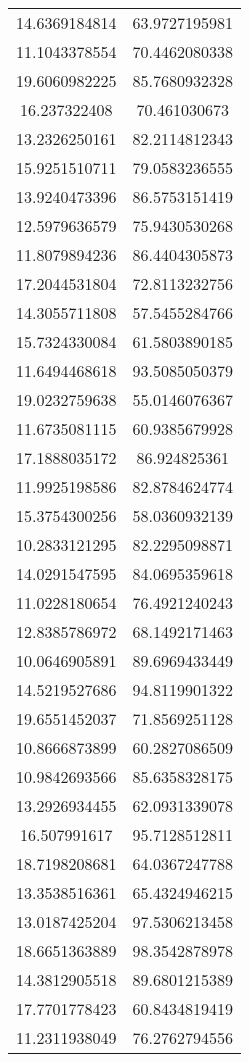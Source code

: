 \begin{table}
\begin{tabular}{cc}
14.6369184814 & 63.9727195981 \\
11.1043378554 & 70.4462080338 \\
19.6060982225 & 85.7680932328 \\
16.237322408 & 70.461030673 \\
13.2326250161 & 82.2114812343 \\
15.9251510711 & 79.0583236555 \\
13.9240473396 & 86.5753151419 \\
12.5979636579 & 75.9430530268 \\
11.8079894236 & 86.4404305873 \\
17.2044531804 & 72.8113232756 \\
14.3055711808 & 57.5455284766 \\
15.7324330084 & 61.5803890185 \\
11.6494468618 & 93.5085050379 \\
19.0232759638 & 55.0146076367 \\
11.6735081115 & 60.9385679928 \\
17.1888035172 & 86.924825361 \\
11.9925198586 & 82.8784624774 \\
15.3754300256 & 58.0360932139 \\
10.2833121295 & 82.2295098871 \\
14.0291547595 & 84.0695359618 \\
11.0228180654 & 76.4921240243 \\
12.8385786972 & 68.1492171463 \\
10.0646905891 & 89.6969433449 \\
14.5219527686 & 94.8119901322 \\
19.6551452037 & 71.8569251128 \\
10.8666873899 & 60.2827086509 \\
10.9842693566 & 85.6358328175 \\
13.2926934455 & 62.0931339078 \\
16.507991617 & 95.7128512811 \\
18.7198208681 & 64.0367247788 \\
13.3538516361 & 65.4324946215 \\
13.0187425204 & 97.5306213458 \\
18.6651363889 & 98.3542878978 \\
14.3812905518 & 89.6801215389 \\
17.7701778423 & 60.8434819419 \\
11.2311938049 & 76.2762794556 \\

\end{tabular}
\end{table}
